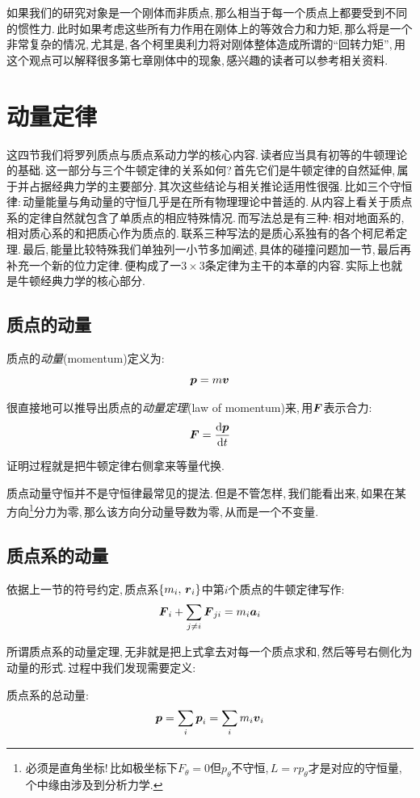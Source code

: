 如果我们的研究对象是一个刚体而非质点,\,那么相当于每一个质点上都要受到不同的惯性力.\,此时如果考虑这些所有力作用在刚体上的等效合力和力矩,\,那么将是一个非常复杂的情况,\,尤其是,\,各个柯里奥利力将对刚体整体造成所谓的``回转力矩'',\,用这个观点可以解释很多第七章刚体中的现象,\,感兴趣的读者可以参考相关资料.

\section{动量定律}
这四节我们将罗列质点与质点系动力学的核心内容.\,读者应当具有初等的牛顿理论的基础.\,这一部分与三个牛顿定律的关系如何?\,首先它们是牛顿定律的自然延伸,\,属于并占据经典力学的主要部分.\,其次这些结论与相关推论适用性很强.\,比如三个守恒律:\,动量能量与角动量的守恒几乎是在所有物理理论中普适的.\,从内容上看关于质点系的定律自然就包含了单质点的相应特殊情况.\,而写法总是有三种:\,相对地面系的,\,相对质心系的和把质心作为质点的.\,联系三种写法的是质心系独有的各个柯尼希定理.\,最后,\,能量比较特殊我们单独列一小节多加阐述,\,具体的碰撞问题加一节,\,最后再补充一个新的位力定律.\,便构成了一$3\times3$条定律为主干的本章的内容.\,实际上也就是牛顿经典力学的核心部分.

\subsection{质点的动量}
质点的\emph{动量}(momentum)定义为:
\[\boldsymbol{p}=m\boldsymbol{v}\]

很直接地可以推导出质点的\emph{动量定理}(law of momentum)来,\,用$\boldsymbol{F}$表示合力:
\[\boldsymbol{F}=\frac{\textrm{d} \boldsymbol{p}}{\textrm{d} t}\]

证明过程就是把牛顿定律右侧拿来等量代换.

质点动量守恒并不是守恒律最常见的提法.\,但是不管怎样,\,我们能看出来,\,如果在某方向\footnote{必须是直角坐标!\,比如极坐标下$F_\theta=0$但$p_\theta$不守恒,\,$L=rp_\theta$才是对应的守恒量,\,个中缘由涉及到分析力学.}分力为零,\,那么该方向分动量导数为零,\,从而是一个不变量.

\subsection{质点系的动量}
依据上一节的符号约定,\,质点系$\{m_i,\,\boldsymbol{r}_i\}$中第$i$个质点的牛顿定律写作:
\[\boldsymbol{F}_i+\sum_{j\neq i}\boldsymbol{F}_{ji}=m_i\boldsymbol{a}_i\]

所谓质点系的动量定理,\,无非就是把上式拿去对每一个质点求和,\,然后等号右侧化为动量的形式.\,过程中我们发现需要定义:

质点系的总动量:
\[\boldsymbol{p}=\sum_i \boldsymbol{p}_i=\sum_i m_i\boldsymbol{v}_i\]

